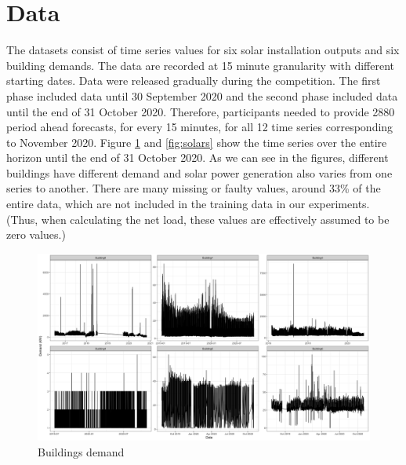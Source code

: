 \documentclass[conference]{IEEEtran}
\begin{document}

\section{Data}

The datasets consist of time series values for six solar installation outputs and six building demands. The data are recorded at 15 minute granularity with different starting dates. Data were released gradually during the competition. The first phase included data until 30 September 2020 and the second phase included data until the end of 31 October 2020. Therefore, participants needed to provide 2880 period ahead forecasts, for every 15 minutes, for all 12 time series corresponding to November 2020. Figure \ref{fig:buildings} and \ref{fig:solars} show the time series over the entire horizon until the end of 31 October 2020. As we can see in the figures, different buildings have different demand and solar power generation also varies from one series to another. There are many missing or faulty values, around 33\% of the entire data, which are not included in the training data in our experiments. (Thus, when calculating the net load, these values are effectively assumed to be zero values.)

\begin{figure}[htbp]
\centerline{\includegraphics[scale=0.15]{buildings.png}}
\caption{Buildings demand}
\label{fig:buildings}
\end{figure}
\end{document}

